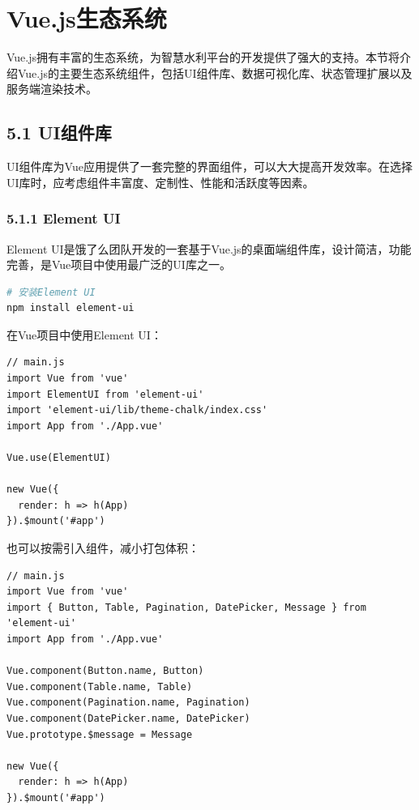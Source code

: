 \section{Vue.js生态系统}\label{vue.jsux751fux6001ux7cfbux7edf}

Vue.js拥有丰富的生态系统，为智慧水利平台的开发提供了强大的支持。本节将介绍Vue.js的主要生态系统组件，包括UI组件库、数据可视化库、状态管理扩展以及服务端渲染技术。

\subsection{5.1 UI组件库}\label{uiux7ec4ux4ef6ux5e93}

UI组件库为Vue应用提供了一套完整的界面组件，可以大大提高开发效率。在选择UI库时，应考虑组件丰富度、定制性、性能和活跃度等因素。

\subsubsection{5.1.1 Element UI}\label{element-ui}

Element
UI是饿了么团队开发的一套基于Vue.js的桌面端组件库，设计简洁，功能完善，是Vue项目中使用最广泛的UI库之一。

\begin{lstlisting}[language=bash]
# 安装Element UI
npm install element-ui
\end{lstlisting}

在Vue项目中使用Element UI：

\begin{lstlisting}
// main.js
import Vue from 'vue'
import ElementUI from 'element-ui'
import 'element-ui/lib/theme-chalk/index.css'
import App from './App.vue'

Vue.use(ElementUI)

new Vue({
  render: h => h(App)
}).$mount('#app')
\end{lstlisting}

也可以按需引入组件，减小打包体积：

\begin{lstlisting}
// main.js
import Vue from 'vue'
import { Button, Table, Pagination, DatePicker, Message } from 'element-ui'
import App from './App.vue'

Vue.component(Button.name, Button)
Vue.component(Table.name, Table)
Vue.component(Pagination.name, Pagination)
Vue.component(DatePicker.name, DatePicker)
Vue.prototype.$message = Message

new Vue({
  render: h => h(App)
}).$mount('#app')
\end{lstlisting}

